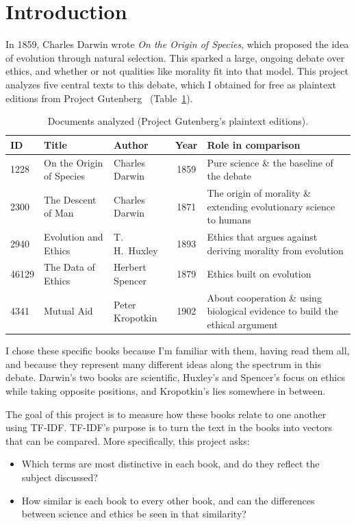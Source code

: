 \documentclass[11pt]{article}
\begin{document}
\section{Introduction}

In 1859, Charles Darwin wrote \emph{On the Origin of Species}, which proposed the idea of evolution through natural selection.
This sparked a large, ongoing debate over ethics, and whether or not qualities like morality fit into that model.
This project analyzes five central texts to this debate, which I obtained for free as plaintext editions from Project Gutenberg~\cite{gutenberg} (Table~\ref{tab:books}).

\begin{table}[H]
	\centering
	\begin{tabular}{lllcp{5.2cm}}
		\toprule
		ID    & Title                    & Author          & Year & Role in comparison \\
		\midrule
		1228  & On the Origin of Species & Charles Darwin  & 1859 & Pure science \& the baseline of the debate \\
		2300  & The Descent of Man       & Charles Darwin  & 1871 & The origin of morality \& extending evolutionary science to humans \\
		2940  & Evolution and Ethics     & T.\,H.\ Huxley  & 1893 & Ethics that argues against deriving morality from evolution \\
		46129 & The Data of Ethics       & Herbert Spencer & 1879 & Ethics built on evolution \\
		4341  & Mutual Aid               & Peter Kropotkin & 1902 & About cooperation \& using biological evidence to build the ethical argument \\
		\bottomrule
	\end{tabular}
	\caption{Documents analyzed (Project Gutenberg's plaintext editions).}
	\label{tab:books}
\end{table}

I chose these specific books because I'm familiar with them, having read them all, and because they represent many different ideas along the spectrum in this debate.
Darwin's two books are scientific, Huxley's and Spencer's focus on ethics while taking opposite positions, and Kropotkin's lies somewhere in between.

The goal of this project is to measure how these books relate to one another using TF-IDF.
TF-IDF's purpose is to turn the text in the books into vectors that can be compared.
More specifically, this project asks:
\begin{itemize}
    \item Which terms are most distinctive in each book, and do they reflect the subject discussed?
    \item How similar is each book to every other book, and can the differences between science and ethics be seen in that similarity?
\end{itemize}
\end{document}
